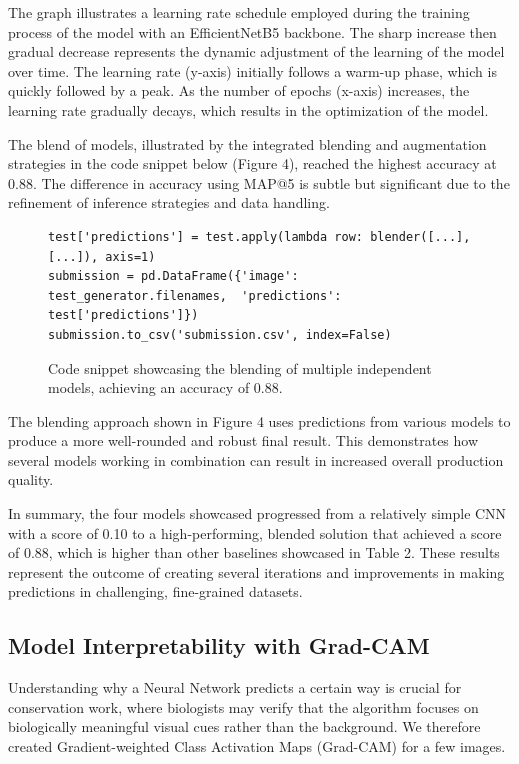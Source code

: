 \documentclass[twocolumn]{article}
\begin{document}
The graph illustrates a learning rate schedule employed during the training process of the model with an EfficientNetB5 backbone. The sharp increase then gradual decrease represents the dynamic adjustment of the learning of the model over time. The learning rate (y-axis) initially follows a warm-up phase, which is quickly followed by a peak. As the number of epochs (x-axis) increases, the learning rate gradually decays, which results in the optimization of the model. 

The blend of models, illustrated by the integrated blending and augmentation strategies in the code snippet below (Figure 4), reached the highest accuracy at 0.88. The difference in accuracy using MAP@5 is subtle but significant due to the refinement of inference strategies and data handling.

\begin{figure}[h!]
\centering
\begin{minipage}{0.99\linewidth}
\begin{lstlisting}
test['predictions'] = test.apply(lambda row: blender([...], [...]), axis=1)
submission = pd.DataFrame({'image': test_generator.filenames,  'predictions': test['predictions']})
submission.to_csv('submission.csv', index=False)
\end{lstlisting}
\end{minipage}
\caption{Code snippet showcasing the blending of multiple independent models, achieving an accuracy of 0.88.}
\end{figure}

The blending approach shown in Figure 4 uses predictions from various models to produce a more well-rounded and robust final result. This demonstrates how several models working in combination can result in increased overall production quality.

In summary, the four models showcased progressed from a relatively simple CNN with a score of 0.10 to a high-performing, blended solution that achieved a score of 0.88, which is higher than other baselines showcased in Table 2. These results represent the outcome of creating several iterations and improvements in making predictions in challenging, fine-grained datasets.

\subsection{Model Interpretability with Grad-CAM}

Understanding why a Neural Network predicts a certain way is crucial for conservation work, where biologists may verify that the algorithm focuses on biologically meaningful visual cues rather than the background. We therefore created Gradient-weighted Class Activation Maps
(Grad-CAM) for a few images. 
\end{document}
